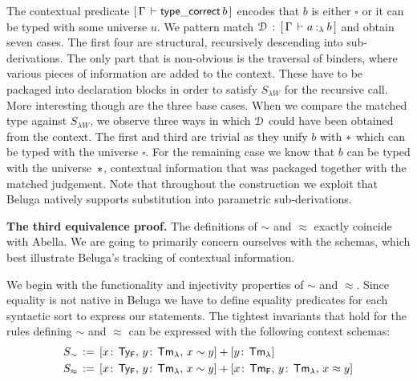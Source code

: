 \documentclass[a4paper,UKenglish]{lipics-v2016}
\newcommand{\ms}{\,}
\newcommand{\mrel}[1]{\mathrel{\ms #1 \ms}}
\newcommand{\OF}{\mrel{:}}
\newcommand{\eqdef}{\mrel{:=}}
\newcommand{\TyF}{\ensuremath{\mathsf{Ty_{F}}}}
\newcommand{\TmF}{\ensuremath{\mathsf{Tm_{F}}}}
\newcommand{\TmL}{\ensuremath{\mathsf{Tm_{\lambda}}}}
\newcommand{\typingLh}[2]{\ensuremath{#1 \mathbin{:_{\lambda}} #2}}
\newcommand{\tyr}{\mathrel{\sim}}
\newcommand{\tmr}{\mathrel{\approx}}
\newcommand{\Prp}{\ensuremath{\textrm{\textasteriskcentered}}}
\newcommand{\Typ}{\ensuremath{\square}}
\theoremstyle{plain}
\begin{document}
The contextual predicate $[\,\Gamma\,\vdash \mathsf{type\_correct}\,b\,]$ encodes that $b$ is either $\Typ$ or it can be typed with some universe $u$.
We pattern match $\D \OF \bc{\Gamma}{\typingLh{a}{b}}$ and obtain seven cases.
The first four are structural, recursively descending into sub-derivations.
The only part that is non-obvious is the traversal of binders, where various pieces of information are added to the context.
These have to be packaged into declaration blocks in order to satisfy $S_{\lambda W}$ for the recursive call.
More interesting though are the three base cases.
When we compare the matched type against $S_{\lambda W}$, we observe three ways in which $\mathcal{D}$ could have been obtained from the context.
The first and third are trivial as they unify $b$ with $\Prp$ which can be typed with the universe $\Typ$.
For the remaining case we know that $b$ can be typed with the universe~$\Prp$, contextual information that was packaged together with the matched judgement.
Note that throughout the construction we exploit that Beluga natively supports substitution into parametric sub-derivations.

{\bf The third equivalence proof.}
The definitions of $\tyr$ and $\tmr$ exactly coincide with Abella.
We are going to primarily concern ourselves with the schemas, which best illustrate Beluga's tracking of contextual information.

We begin with the functionality and injectivity properties of $\tyr$ and $\tmr$.
Since equality is not native in Beluga we have to define equality predicates for each syntactic sort to express our statements. The tightest invariants that hold for the rules defining $\tyr$ and $\tmr$ can be expressed with the following context schemas:
\begin{align*}
  S_{\tyr} &\eqdef [x\sof\TyF \ssep y\sof\TmL \ssep x \tyr y] + [y\sof\TmL]\\
  S_{\tmr} &\eqdef [x\sof\TyF \ssep y\sof\TmL \ssep x \tyr y] + [x\sof\TmF \ssep y\sof\TmL \ssep x \tmr y]
\end{align*}
\end{document}

